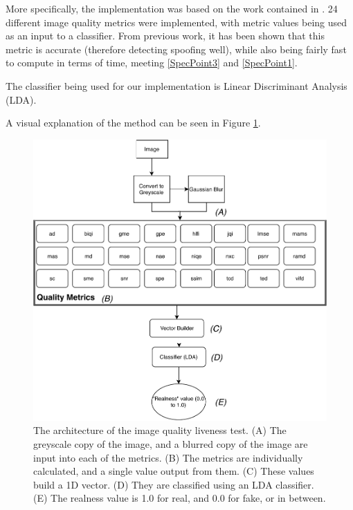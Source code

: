 \documentclass[10pt,a4paper]{article}
\begin{document}
            More specifically, the implementation was based on the work contained in \cite{ImageQualityAssessmentTest}. 24 different image quality metrics were implemented,
            with metric values being used as an input to a classifier. From previous work, it has been shown that this metric is accurate (therefore detecting spoofing well), while
            also being fairly fast to compute in terms of time, meeting \ref{SpecPoint3} and \ref{SpecPoint1}.

            The classifier being used for our implementation is Linear Discriminant Analysis (LDA).

            A visual explanation of the method can be seen in Figure \ref{ImageQualityLivenessTestDiagram}. 

            \begin{figure}
                \centering
                \includegraphics[width=\linewidth]{ImageQualityLivenessTest.pdf}
                \caption{The architecture of the image quality liveness test. (A) The greyscale copy of the image, and a blurred copy of the image are input into each of the metrics.
                (B) The metrics are individually calculated, and a single value output from them. (C) These values build a 1D vector. (D) They are classified using an LDA classifier. (E) The realness value
                is 1.0 for real, and 0.0 for fake, or in between.}
                \label{ImageQualityLivenessTestDiagram}
            \end{figure}
    
\end{document}
